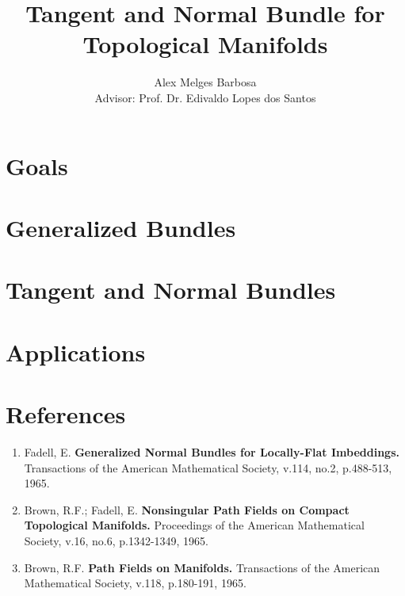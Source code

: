 \documentclass[ra0]{sciposter}
\title{Tangent and Normal Bundle for Topological Manifolds}
\author{Alex Melges Barbosa \\
Advisor: Prof. Dr. Edivaldo Lopes dos Santos}
\institute{Universidade Federal de São Carlos}
\begin{document}
    \selectfont

    \maketitle

    \begin{multicols}{2}
        \section*{Goals}

        \section*{Generalized Bundles}

        \section*{Tangent and Normal Bundles}

        \section*{Applications}

        \section*{References}

        \begin{enumerate}
            \item Fadell, E. {\bf Generalized Normal Bundles for Locally-Flat Imbeddings.} Transactions of the American Mathematical Society, v.114, no.2, p.488-513, 1965.
            \item Brown, R.F.; Fadell, E. {\bf Nonsingular Path Fields on Compact Topological Manifolds.} Proceedings of the American Mathematical Society, v.16, no.6, p.1342-1349, 1965.
            \item Brown, R.F. {\bf Path Fields on Manifolds.} Transactions of the American Mathematical Society, v.118, p.180-191, 1965.
        \end{enumerate}
    \end{multicols}
\end{document}
